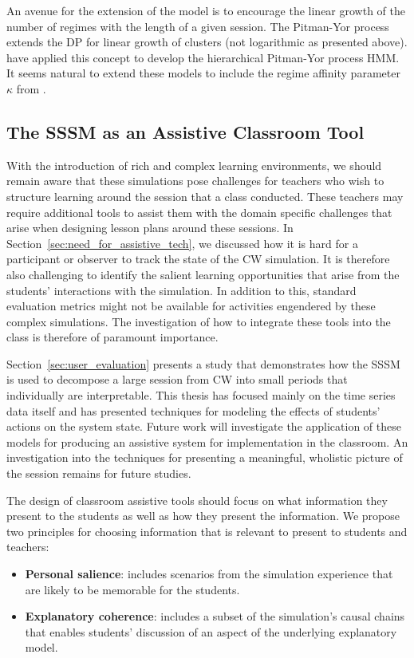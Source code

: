 An avenue for the extension of the \cite{fox2009nonparametric} model is to encourage the linear growth of the number of regimes with the length of a given session. The Pitman-Yor process~\citep{pitman1997two} extends the DP for linear growth of clusters (not logarithmic as presented above). \cite{blunsom2011hierarchical} have applied this concept to develop the hierarchical Pitman-Yor process HMM. It seems natural to extend these models to include the regime affinity parameter $\kappa$ from \cite{fox2007hierarchical,fox2009nonparametric}.

\subsection{The SSSM as an Assistive Classroom Tool}\label{sec:class-assistive}
With the introduction of rich and complex learning environments, we should remain aware that these simulations pose challenges for teachers who wish to structure learning around the session that a class conducted. These teachers may require additional tools to assist them with the domain specific challenges that arise when designing lesson plans around these sessions. In Section~\ref{sec:need_for_assistive_tech}, we discussed how it is hard for a participant or observer to track the state of the CW simulation. It is therefore also challenging to identify the salient learning opportunities that arise from the students' interactions with the simulation. In addition to this, standard evaluation metrics might not be available for activities engendered by these complex simulations. The investigation of how to integrate these tools into the class is therefore of paramount importance.

Section~\ref{sec:user_evaluation} presents a study that demonstrates how the SSSM is used to decompose a large session from CW into small periods that individually are interpretable. This thesis has focused mainly on the time series data itself and has presented techniques for modeling the effects of students' actions on the system state. Future work will investigate the application of these models for producing an assistive system for implementation in the classroom. An investigation into the techniques for presenting a meaningful, wholistic picture of the session remains for future studies.

The design of classroom assistive tools should focus on what information they present to the students as well as how they present the information. We propose two principles for choosing information that is relevant to present to students and teachers:
\begin{itemize}
  \item \textbf{Personal salience}: includes scenarios from the simulation experience that are likely to be memorable for the students.
  \item \textbf{Explanatory coherence}: includes a subset of the simulation’s causal chains that enables students’ discussion of an aspect of the underlying explanatory model.
\end{itemize}

